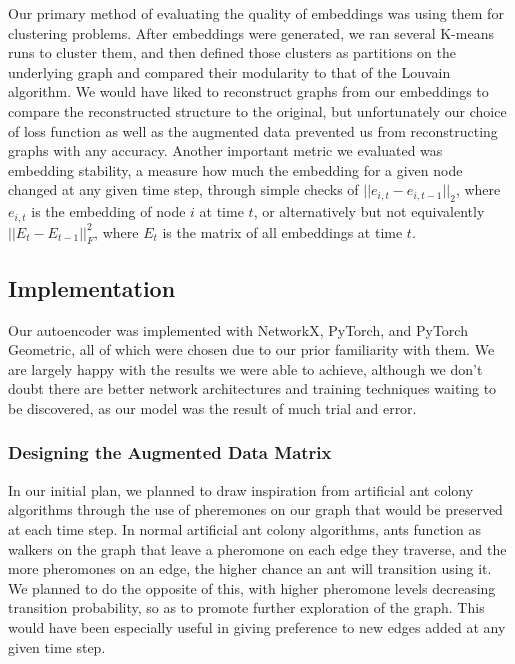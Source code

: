 \documentclass[12pt,twoside]{report}
\begin{document}
Our primary method of evaluating the quality of embeddings was using them for clustering problems. After embeddings were generated, we ran several K-means runs to cluster them, and then defined those clusters as partitions on the underlying graph and compared their modularity to that of the Louvain algorithm. We would have liked to reconstruct graphs from our embeddings to compare the reconstructed structure to the original, but unfortunately our choice of loss function as well as the augmented data prevented us from reconstructing graphs with any accuracy. Another important metric we evaluated was embedding stability, a measure how much the embedding for a given node changed at any given time step, through simple checks of $||e_{i,t} - e_{i,t-1}||_2$, where $e_{i,t}$ is the embedding of node $i$ at time $t$, or alternatively but not equivalently $||E_{t} - E_{t-1}||^2_F$, where $E_t$ is the matrix of all embeddings at time $t$. \\

\subsection{Implementation}

Our autoencoder was implemented with NetworkX, PyTorch, and PyTorch Geometric, all of which were chosen due to our prior familiarity with them. We are largely happy with the results we were able to achieve, although we don't doubt there are better network architectures and training techniques waiting to be discovered, as our model was the result of much trial and error. \\

\subsubsection{Designing the Augmented Data Matrix}

In our initial plan, we planned to draw inspiration from artificial ant colony algorithms \cite{bertelle2006organization, zhou2015ant} through the use of pheremones on our graph that would be preserved at each time step. In normal artificial ant colony algorithms, ants function as walkers on the graph that leave a pheromone on each edge they traverse, and the more pheromones on an edge, the higher chance an ant will transition using it. We planned to do the opposite of this, with higher pheromone levels decreasing transition probability, so as to promote further exploration of the graph. This would have been especially useful in giving preference to new edges added at any given time step. \\
\end{document}
